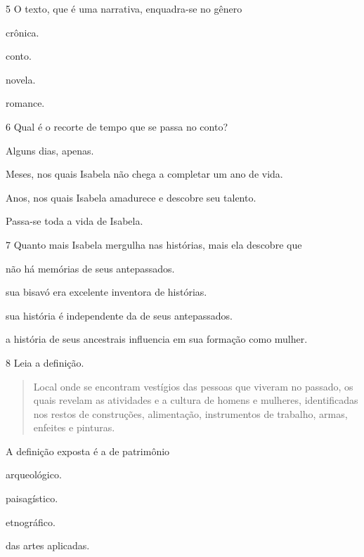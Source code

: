 \num{5} O texto, que é uma narrativa, enquadra-se no gênero

\begin{escolha}
\item
  crônica.
\item
  conto.
\item
  novela.
\item
  romance.
\end{escolha}

\pagebreak
\num{6} Qual é o recorte de tempo que se passa no conto?

\begin{escolha}
\item
  Alguns dias, apenas.
\item
  Meses, nos quais Isabela não chega a completar um ano de vida.
\item
  Anos, nos quais Isabela amadurece e descobre seu talento.
\item
  Passa-se toda a vida de Isabela.
\end{escolha}

\num{7} Quanto mais Isabela mergulha nas histórias, mais ela descobre que

\begin{escolha}
\item
  não há memórias de seus antepassados.
\item
  sua bisavó era excelente inventora de histórias.
\item
  sua história é independente da de seus antepassados.
\item
  a história de seus ancestrais influencia em sua formação como mulher.
\end{escolha}

\num{8} Leia a definição.

\begin{quote}
Local onde se encontram vestígios das pessoas que viveram no
passado, os quais revelam as atividades e a cultura de homens e
mulheres, identificadas nos restos de construções, alimentação,
instrumentos de trabalho, armas, enfeites e pinturas.
\end{quote}

A definição exposta é a de patrimônio

\begin{escolha}
\item
  arqueológico.
\item
  paisagístico.
\item
  etnográfico.
\item
  das artes aplicadas.
\end{escolha}


